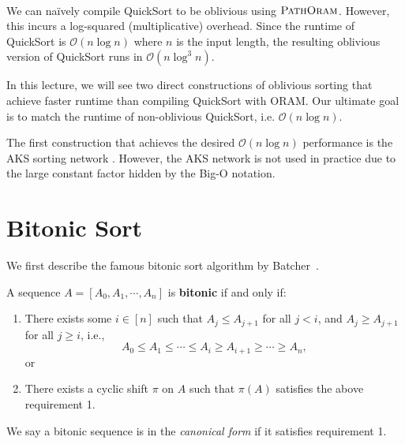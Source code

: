 $ $

We can na\"ively compile QuickSort to be oblivious using $\textsc{PathOram}$. However, this incurs a log-squared (multiplicative) overhead. Since the runtime of QuickSort is $\mathcal{O}(n\log n)$ where $n$ is the input length, the resulting oblivious version of QuickSort runs in $\mathcal{O}(n\log^3 n)$.

In this lecture, we will see two direct constructions of oblivious sorting that achieve faster runtime than compiling QuickSort with ORAM. Our ultimate goal is to match the runtime of non-oblivious QuickSort, i.e. $\mathcal{O}(n\log n)$.

\begin{mdframed}[innertopmargin=0pt, skipabove=\topskip, skipbelow=\topskip,align=left]
   \begin{remark}
       The first construction that achieves the desired $\mathcal{O}(n \log n)$ performance is the AKS sorting network \cite{aks}. However, the AKS network is not used in practice due to the large constant factor hidden by the Big-O notation.
       
   \end{remark}
\end{mdframed}

\section{Bitonic Sort}
We first describe the famous bitonic sort algorithm by Batcher~\cite{Batcher}.

\begin{definition}
    A sequence $A = [A_0, A_1, \cdots, A_n]$ is \textbf{bitonic} if and only if:
    \begin{enumerate}
        \item There exists some $i \in [n]$ such that $A_j \leq A_{j+1}$ for all $j < i$, and $A_j \geq A_{j+1}$ for all $j \geq i$, i.e., 
        \[A_0 \leq A_1 \leq \cdots \leq A_i \geq A_{i+1} \geq \cdots \geq A_n, \]
        or

        \item There exists a cyclic shift $\pi$ on $A$ such that $\pi(A)$ satisfies the above requirement 1.
    \end{enumerate}

We say a bitonic sequence is in the {\it canonical form} if it satisfies requirement 1.
\end{definition}

$ $

